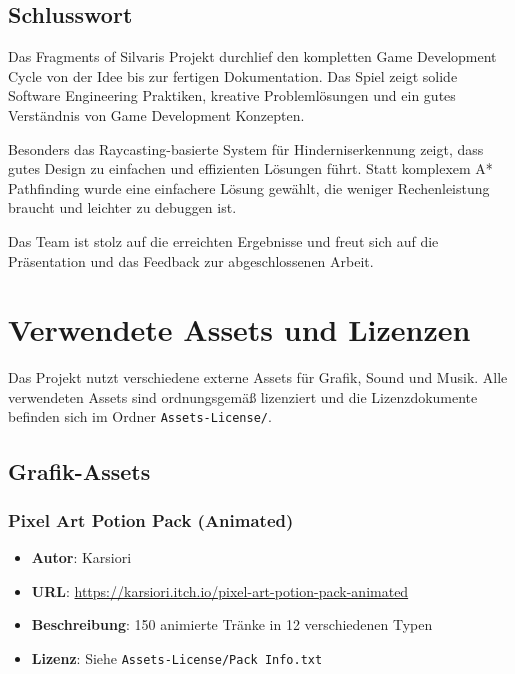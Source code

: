 \documentclass[
  a4paper,
  11pt,
  ngerman,
  parskip=half,
  bibliography=totoc,
  listof=totoc
]{scrreprt}
\begin{document}
\section{Schlusswort}

Das Fragments of Silvaris Projekt durchlief den kompletten Game Development Cycle von der Idee bis zur fertigen Dokumentation. Das Spiel zeigt solide Software Engineering Praktiken, kreative Problemlösungen und ein gutes Verständnis von Game Development Konzepten.

Besonders das Raycasting-basierte System für Hinderniserkennung zeigt, dass gutes Design zu einfachen und effizienten Lösungen führt. Statt komplexem A* Pathfinding wurde eine einfachere Lösung gewählt, die weniger Rechenleistung braucht und leichter zu debuggen ist.

Das Team ist stolz auf die erreichten Ergebnisse und freut sich auf die Präsentation und das Feedback zur abgeschlossenen Arbeit.


\chapter{Verwendete Assets und Lizenzen}

Das Projekt nutzt verschiedene externe Assets für Grafik, Sound und Musik. Alle verwendeten Assets sind ordnungsgemäß lizenziert und die Lizenzdokumente befinden sich im Ordner \texttt{Assets-License/}.

\section{Grafik-Assets}

\subsection{Pixel Art Potion Pack (Animated)}
\begin{itemize}
    \item \textbf{Autor}: Karsiori
    \item \textbf{URL}: \url{https://karsiori.itch.io/pixel-art-potion-pack-animated}
    \item \textbf{Beschreibung}: 150 animierte Tränke in 12 verschiedenen Typen
    \item \textbf{Lizenz}: Siehe \texttt{Assets-License/Pack Info.txt}
\end{itemize}
\end{document}
